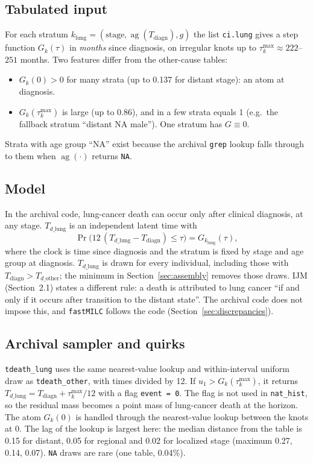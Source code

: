\documentclass[11pt]{article}
\newcommand{\code}[1]{\texttt{#1}}
\newcommand{\ag}{\operatorname{ag}}
\newcommand{\sex}{g}
\newcommand{\Tdiagn}{T_{\mathrm{diagn}}}
\newcommand{\Tdo}{T_{d\_\mathrm{other}}}
\newcommand{\Tdl}{T_{d\_\mathrm{lung}}}
\begin{document}
\subsection{Tabulated input}
For each stratum $k_{\mathrm{lung}}=(\mathrm{stage}, \ag(\Tdiagn), \sex)$ the
list \code{ci.lung} gives a step function $G_k(\tau)$ in \emph{months} since
diagnosis, on irregular knots up to $\tau^{\max}_k \approx 222$--$251$ months.
Two features differ from the other-cause tables:
\begin{itemize}[nosep]
\item $G_k(0)>0$ for many strata (up to 0.137 for distant stage): an atom at
  diagnosis.
\item $G_k(\tau^{\max}_k)$ is large (up to 0.86), and in a few strata equals 1
  (e.g.\ the fallback stratum ``distant NA male''). One stratum has $G\equiv 0$.
\end{itemize}
Strata with age group ``NA'' exist because the archival \code{grep} lookup
falls through to them when $\ag(\cdot)$ returns \code{NA}.

\subsection{Model}
In the archival code, lung-cancer death can occur only after clinical diagnosis,
at any stage. $\Tdl$ is an independent latent time with
\begin{equation}\label{eq:TLC}
\Pr\!\big(12\,(\Tdl-\Tdiagn) \le \tau\big) = G_{k_{\mathrm{lung}}}(\tau),
\end{equation}
where the clock is time since diagnosis and the stratum is fixed by stage and
age group at diagnosis. $\Tdl$ is drawn for every individual, including those
with $\Tdiagn > \Tdo$; the minimum in Section~\ref{sec:assembly} removes those
draws. IJM (Section~2.1) states a different rule: a death is attributed to lung
cancer ``if and only if it occurs after transition to the distant state''. The
archival code does not impose this, and \code{fastMILC} follows the code
(Section~\ref{sec:discrepancies}).

\subsection{Archival sampler and quirks}
\code{tdeath\_lung} uses the same nearest-value lookup and within-interval
uniform draw as \code{tdeath\_other}, with times divided by 12. If
$u_1 > G_k(\tau^{\max}_k)$, it returns $\Tdl = \Tdiagn + \tau^{\max}_k/12$ with a
flag \code{event = 0}. The flag is not used in \code{nat\_hist}, so the
residual mass becomes a point mass of lung-cancer death at the horizon. The atom
$G_k(0)$ is handled through the nearest-value lookup between the knots at 0.
The lag of the lookup is largest here: the median distance from the table is
0.15 for distant, 0.05 for regional and 0.02 for localized stage (maximum 0.27,
0.14, 0.07). \code{NA} draws are rare (one table, 0.04\%).
\end{document}

